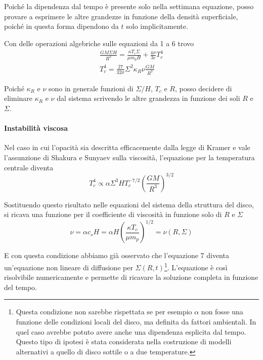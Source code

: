 \documentclass[a4paperbi]{article}
\begin{document}
	Poiché la dipendenza dal tempo è presente solo nella settimana equazione, posso provare a esprimere le altre grandezze in funzione della densità superficiale, poiché in questa forma dipendono da $t$ solo implicitamente.
	
	Con delle operazioni algebriche sulle equazioni da 1 a 6 trovo
	\begin{gather}
		\frac{GM\Sigma H}{R^3}=\frac{\kappa T_c\Sigma}{\mu m_p H}+\frac{4\sigma}{3c}T_c^4\\
		T^4_c=\frac{27}{32\sigma}\Sigma^2\kappa_R\nu\frac{GM}{R^3}
	\end{gather}
	
	Poiché $\kappa_R$ e $\nu$ sono in generale funzioni di $\Sigma/H$, $T_c$ e $R$, posso decidere di eliminare $\kappa_R$ e $\nu$ dal sistema scrivendo le altre grandezza in funzione dei soli $R$ e $\Sigma$.
		
	\paragraph{Instabilità viscosa}
	
	Nel caso in cui l'opacità sia descritta efficacemente dalla legge di Kramer e vale l'assunzione di Shakura e Sunyaev sulla viscosità, l'equazione per la temperatura centrale diventa
	\begin{equation*}
		T^4_c\propto\alpha\Sigma^3HT_c^{-7/2}\left(\frac{GM}{R^3}\right)^{3/2}
	\end{equation*}
	
	Sostituendo questo risultato nelle equazioni del sistema della struttura del disco, si ricava una funzione per il coefficiente di viscosità in funzione solo di $R$ e $\Sigma$
	\begin{equation*}
		\nu=\alpha c_sH=\alpha H\left(\frac{\kappa T_c}{\mu m_p}\right)^{1/2}=\nu(R,\Sigma)
	\end{equation*}
	
	E con questa condizione abbiamo già osservato che l'equazione 7 diventa un'equazione non lineare di diffusione per $\Sigma(R,t)$\footnote{Questa condizione non sarebbe rispettata se per esempio $\alpha$ non fosse una funzione delle condizioni locali del disco, ma definita da fattori ambientali. In quel caso avrebbe potuto avere anche una dipendenza esplicita dal tempo. Questo tipo di ipotesi è stata considerata nella costruzione di modelli alternativi a quello di disco sottile o a due temperature.}. L'equazione è così risolvibile numericamente e permette di ricavare la soluzione completa in funzione del tempo.
\end{document}

